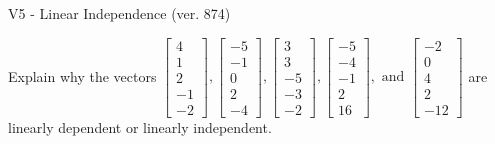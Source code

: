 \begin{exercise}
  \begin{exerciseTitle}V5 - Linear Independence (ver. 874)\end{exerciseTitle}
  \begin{exerciseStatement}
    Explain why the vectors \(\left[\begin{array}{r}
4 \\
1 \\
2 \\
-1 \\
-2
\end{array}\right] , \left[\begin{array}{r}
-5 \\
-1 \\
0 \\
2 \\
-4
\end{array}\right] , \left[\begin{array}{r}
3 \\
3 \\
-5 \\
-3 \\
-2
\end{array}\right] , \left[\begin{array}{r}
-5 \\
-4 \\
-1 \\
2 \\
16
\end{array}\right] , \text{ and } \left[\begin{array}{r}
-2 \\
0 \\
4 \\
2 \\
-12
\end{array}\right]\) are linearly dependent or linearly independent.	



\end{exerciseStatement}
\end{exercise}
